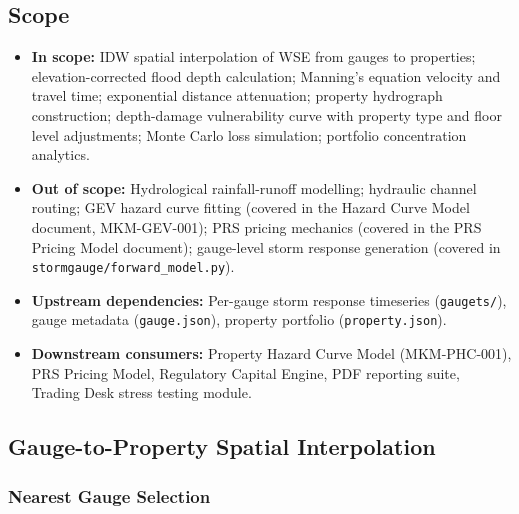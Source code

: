 \documentclass[11pt,a4paper]{article}
\begin{document}
\subsection{Scope}
\begin{itemize}[nosep]
    \item \textbf{In scope:} IDW spatial interpolation of WSE from gauges to
          properties; elevation-corrected flood depth calculation; Manning's equation
          velocity and travel time; exponential distance attenuation; property
          hydrograph construction; depth-damage vulnerability curve with property type
          and floor level adjustments; Monte Carlo loss simulation; portfolio
          concentration analytics.
    \item \textbf{Out of scope:} Hydrological rainfall-runoff modelling; hydraulic
          channel routing; GEV hazard curve fitting (covered in the Hazard Curve Model
          document, MKM-GEV-001); PRS pricing mechanics (covered in the PRS Pricing
          Model document); gauge-level storm response generation (covered in
          \texttt{stormgauge/forward\_model.py}).
    \item \textbf{Upstream dependencies:} Per-gauge storm response timeseries
          (\texttt{gaugets/}), gauge metadata (\texttt{gauge.json}), property
          portfolio (\texttt{property.json}).
    \item \textbf{Downstream consumers:} Property Hazard Curve Model (MKM-PHC-001),
          PRS Pricing Model, Regulatory Capital Engine, PDF reporting suite, Trading
          Desk stress testing module.
\end{itemize}

\mkmframework

\subsection{Gauge-to-Property Spatial Interpolation}
\label{sec:spatial_interp}

\subsubsection{Nearest Gauge Selection}
\end{document}
